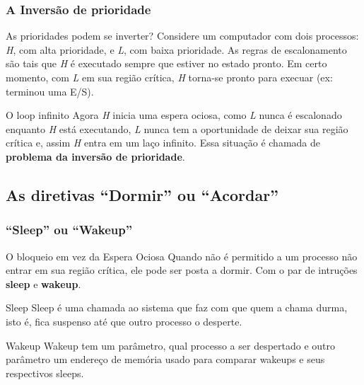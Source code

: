 \documentclass[11pt]{beamer}
\begin{document}
\begin{frame}\frametitle{A Inversão de prioridade}

\begin{block}{ As prioridades podem se inverter?}
Considere um computador com dois processos: \textit{H}, com alta prioridade, e \textit{L}, com baixa prioridade. As regras de escalonamento são tais que \textit{H} é 
executado sempre que estiver no estado pronto. Em certo momento, com \textit{L} em sua região crítica, \textit{H} torna-se pronto para execuar (ex: terminou uma E/S).
\end{block}

\pause
\begin{block}{O loop infinito}
 Agora \textit{H} inicia uma espera ociosa, como \textit{L} nunca é escalonado enquanto \textit{H} está executando, \textit{L} nunca tem a oportunidade de deixar sua região 
 crítica e, assim \textit{H} entra em um laço infinito. Essa situação é chamada de \textbf{problema da inversão de prioridade}.
\end{block}
\end{frame}


\subsection*{ As diretivas ``Dormir'' ou ``Acordar''}
\begin{frame}\frametitle{``Sleep'' ou ``Wakeup''}

\begin{block}{O bloqueio em vez da Espera Ociosa}
Quando não é permitido a um processo não entrar em sua região crítica, ele pode ser posta a dormir.
Com o par de intruções \textbf{sleep} e \textbf{wakeup}.
\end{block}

\pause
\begin{block}{ Sleep}
 Sleep é uma chamada ao sistema que faz com que quem a chama durma, isto é, fica suspenso até que outro processo o desperte.
\end{block}

\pause
\begin{block}{ Wakeup}
 Wakeup tem um parâmetro, qual processo a ser despertado e outro parâmetro um endereço de memória usado para comparar wakeups e seus respectivos sleeps.
\end{block}
\end{frame}
\end{document}

